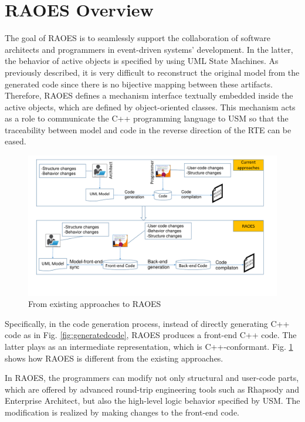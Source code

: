 \section{RAOES Overview}
\label{sec:overview}
The goal of RAOES is to seamlessly support the collaboration of software architects and programmers in event-driven systems' development.
In the latter, the behavior of active objects is specified by using UML State Machines.
As previously described, it is very difficult to reconstruct the original model from the generated code since there is no bijective mapping between these artifacts.
Therefore, RAOES defines a mechanism interface textually embedded inside the active objects, which are defined by object-oriented classes. 
This mechanism acts as a role to communicate the C++ programming language to USM so that the traceability between model and code in the reverse direction of the RTE can be eased.

\begin{figure}
	\centering
	\includegraphics[clip, trim=0.6cm 2.8cm 1.4cm 0.5cm, width=1.0\columnwidth]{figures/frontend}
	\caption{From existing approaches to RAOES} 
	\label{fig:raoes}
\end{figure}

Specifically, in the code generation process, instead of directly generating C++ code as in Fig. \ref{fig:generatedcode}, RAOES produces a front-end C++ code.
The latter plays as an intermediate representation, which is C++-conformant.
Fig. \ref{fig:raoes} shows how RAOES is different from the existing approaches.

In RAOES, the programmers can modify not only structural and user-code parts, which are offered by advanced round-trip engineering tools such as Rhapsody and Enterprise Architect, but also the high-level logic behavior specified by USM.
The modification is realized by making changes to the front-end code.





